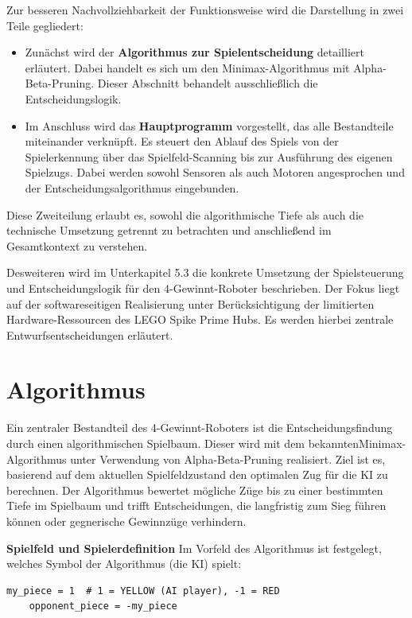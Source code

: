 Zur besseren Nachvollziehbarkeit der Funktionsweise wird die Darstellung in zwei Teile gegliedert:

\begin{itemize}
	\item Zunächst wird der \textbf{Algorithmus zur Spielentscheidung} detailliert erläutert. Dabei handelt es sich um den Minimax-Algorithmus mit Alpha-Beta-Pruning. Dieser Abschnitt behandelt ausschließlich die Entscheidungslogik.
	
	\item Im Anschluss wird das \textbf{Hauptprogramm} vorgestellt, das alle Bestandteile miteinander verknüpft. Es steuert den Ablauf des Spiels von der Spielerkennung über das Spielfeld-Scanning bis zur Ausführung des eigenen Spielzugs. Dabei werden sowohl Sensoren als auch Motoren angesprochen und der Entscheidungsalgorithmus eingebunden.
\end{itemize}

Diese Zweiteilung erlaubt es, sowohl die algorithmische Tiefe als auch die technische Umsetzung getrennt zu betrachten und anschließend im Gesamtkontext zu verstehen.

Desweiteren wird im Unterkapitel 5.3 die konkrete Umsetzung der Spielsteuerung und Entscheidungslogik für den 4-Gewinnt-Roboter beschrieben. Der Fokus liegt auf der softwareseitigen Realisierung unter Berücksichtigung der limitierten Hardware-Ressourcen des LEGO Spike Prime Hubs. Es werden hierbei zentrale Entwurfsentscheidungen erläutert.


\section{Algorithmus}

Ein zentraler Bestandteil des 4-Gewinnt-Roboters ist die Entscheidungsfindung durch einen algorithmischen Spielbaum. Dieser wird mit dem bekannten\newline Minimax-Algorithmus unter Verwendung von Alpha-Beta-Pruning realisiert. Ziel ist es, basierend auf dem aktuellen Spielfeldzustand den optimalen Zug für die KI zu berechnen.
Der Algorithmus bewertet mögliche Züge bis zu einer bestimmten Tiefe im Spielbaum und trifft Entscheidungen, die langfristig zum Sieg führen können oder gegnerische Gewinnzüge verhindern.

\textbf{Spielfeld und Spielerdefinition}
Im Vorfeld des Algorithmus ist festgelegt, welches Symbol der Algorithmus (die KI) spielt:

\begin{lstlisting}[style=pythonstyle]
	my_piece = 1  # 1 = YELLOW (AI player), -1 = RED
	opponent_piece = -my_piece
\end{lstlisting}

